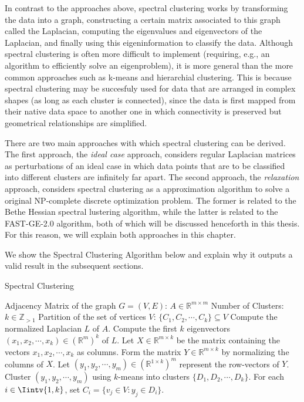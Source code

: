 In contrast to the approaches above, spectral clustering works by transforming the data into a graph, constructing a certain matrix associated to this graph called the Laplacian, computing the eigenvalues and eigenvectors of the Laplacian, and finally using this eigeninformation to classify the data.
Although spectral clustering is often more difficult to implement (requiring, e.g., an algorithm to efficiently solve an eigenproblem), it is more general than the more common approaches such as k-means and hierarchial clustering.
This is because spectral clustering may be succesfuly used for data that are arranged in complex shapes (as long as each cluster is connected), since the data is first mapped from their native data space to another one in which connectivity is preserved but geometrical relationships are simplified.

There are two main approaches with which spectral clustering can be derived.
The first approach, the \textit{ideal case} approach, considers regular Laplacian matrices as perturbations of an ideal case in which data points that are to be classified into different clusters are infinitely far apart.
The second approach, the \textit{relaxation} approach, considers spectral clustering as a approximation algorithm to solve a original NP-complete discrete optimization problem.
The former is related to the Bethe Hessian spectral lustering algorithm, while the latter is related to the FAST-GE-2.0 algorithm, both of which will be discussed henceforth in this thesis.
For this reason, we will explain both approaches in this chapter.

We show the Spectral Clustering Algorithm below and explain why it outputs a valid result in the subsequent sections.

\begin{algorithm}
\caption{Spectral Clustering}\label{spectral_clustering}
\begin{algorithmic}[1]
   \Require 
      \Statex Adjacency Matrix of the graph $G = (V,E)$: $A \in \mathbb R ^ {m \times m}$ 
      \Statex Number of Clusters: $k \in \mathbb Z_{>1}$
   \Ensure 
      \Statex Partition of the set of vertices $V$: $\{ C_1, C_2, \cdots, C_k \} \subseteq V$
      \vspace{0.2 cm}
   \State Compute the normalized Laplacian $L$ of $A$.
   \State Compute the first $k$ eigenvectors $(x_1, x_2, \cdots, x_k) \in (\mathbb R^{m})^k$ of $L$.
   \State Let $X \in \mathbb R^{m \times k}$ be the matrix containing the vectors $x_1, x_2, \cdots, x_k$ as columns.
   \State Form the matrix $Y \in \mathbb R^{m \times k}$ by normalizing the columns of $X$.
   \State Let $(y_1, y_2, \cdots, y_m) \in ( \mathbb R^{1 \times k} )^m$ represent the row-vectors of $Y$.
   \State Cluster $(y_1, y_2, \cdots, y_m)$ using $k$-means into clusters $\{ D_1, D_2, \cdots, D_k \} $.
   \State For each $i \in \Iintv{1,k}$, set $C_i = \{ v_j \in V: y_j \in D_i \}$.
\end{algorithmic}
\end{algorithm}





